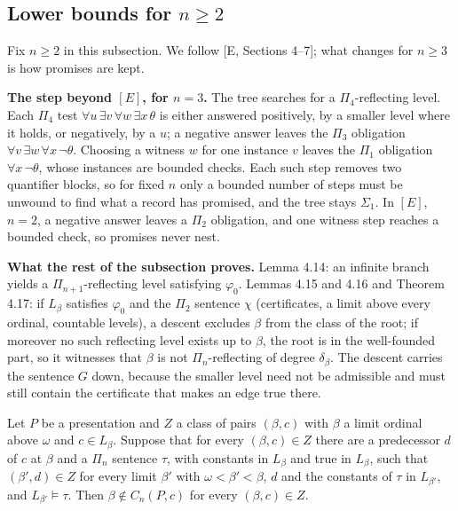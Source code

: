 \documentclass[11pt]{article}
\begin{document}
\subsection{\texorpdfstring{Lower bounds for $n \ge 2$}{Lower bounds for n >= 2}}

Fix $n \ge 2$ in this subsection. We follow [E, Sections 4--7]; what changes for $n \ge 3$ is how promises are kept.

\textbf{The step beyond $[E]$, for $n = 3$.} The tree searches for a $\Pi_4$-reflecting level. Each $\Pi_4$ test $\forall u\,
\exists v\, \forall w\, \exists x\, \theta$ is either answered positively, by a smaller level where it holds, or
negatively, by a $u$; a negative answer leaves the $\Pi_3$ obligation $\forall v\, \exists w\, \forall x\, \neg\theta$.
Choosing a witness $w$ for one instance $v$ leaves the $\Pi_1$ obligation $\forall x\, \neg\theta$, whose instances are
bounded checks. Each such step removes two quantifier blocks, so for fixed $n$ only a bounded number of steps must be
unwound to find what a record has promised, and the tree stays $\Sigma_1$. In $[E]$, $n = 2$, a negative answer leaves a
$\Pi_2$ obligation, and one witness step reaches a bounded check, so promises never nest.

\textbf{What the rest of the subsection proves.} Lemma 4.14: an infinite branch yields a $\Pi_{n+1}$-reflecting level
satisfying $\varphi_0$. Lemmas 4.15 and 4.16 and Theorem 4.17: if $L_\beta$ satisfies $\varphi_0$ and the
$\Pi_2$ sentence $\chi$ (certificates, a limit above every ordinal, countable levels), a descent excludes $\beta$ from
the class of the root; if moreover no such reflecting level exists up to $\beta$, the root is in the well-founded
part, so it witnesses that $\beta$ is not $\Pi_n$-reflecting of degree $\delta_\beta$. The descent carries the sentence $G$ down, because the smaller level need
not be admissible and must still contain the certificate that makes an edge true there.

\begin{statement} Let $P$ be a presentation and $Z$ a class of pairs $(\beta, c)$ with
$\beta$ a limit ordinal above $\omega$ and $c \in L_\beta$. Suppose that for every $(\beta, c) \in Z$ there are a
predecessor $d$ of $c$ at $\beta$ and a $\Pi_n$ sentence $\tau$, with constants in $L_\beta$ and true in $L_\beta$,
such that $(\beta', d) \in Z$ for every limit $\beta'$ with $\omega < \beta' < \beta$, $d$ and the constants of $\tau$
in $L_{\beta'}$, and $L_{\beta'} \models \tau$. Then $\beta \notin C_n(P, c)$ for every $(\beta, c) \in Z$.
\end{statement}
\end{document}
